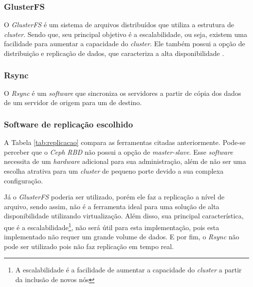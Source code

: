 \subsubsection{GlusterFS}
\label{section:glusterfs}
O \textit{GlusterFS} \cite{glusterfs} é um sistema de arquivos distribuídos que utiliza a estrutura de \textit{cluster}. Sendo que, seu principal
objetivo é a escalabilidade, ou seja, existem uma facilidade para aumentar a capacidade do \textit{cluster}.
Ele também possui a opção de distribuição e replicação de dados, que caracteriza a alta disponibilidade \cite{glusterfs}.

\subsubsection{Rsync}
\label{section:rsync}
O \textit{Rsync} \cite{rsync} é um \textit{software} que sincroniza os servidores a partir de cópia dos dados de um servidor de origem 
para um de destino.


\subsubsection{Software de replicação escolhido}
\label{section:replicacaoescolhido}

A Tabela \ref{tab:replicacao} compara as ferramentas citadas anteriormente. Pode-se perceber que o \textit{Ceph RBD} não possui a opção de
\textit{master-slave}. Esse \textit{software} necessita de um \textit{hardware} adicional para sua administração, além de não ser uma escolha 
atrativa para um \textit{cluster} de pequeno porte devido a sua complexa configuração. 

Já o \textit{GlusterFS} poderia ser utilizado, porém ele faz a replicação a nível de arquivo, sendo assim, não é a ferramenta ideal para uma 
solução de alta disponibilidade utilizando virtualização. Além disso, sua principal característica, que é a escalabilidade\footnote[1]{A 
escalabilidade é a facilidade de aumentar a capacidade do \textit{cluster} a partir da inclusão de novos nós}, não será útil para esta 
implementação, pois esta implementado não requer um grande volume de dados.
E por fim, o \textit{Rsync} não pode ser utilizado pois não faz replicação em tempo real.

